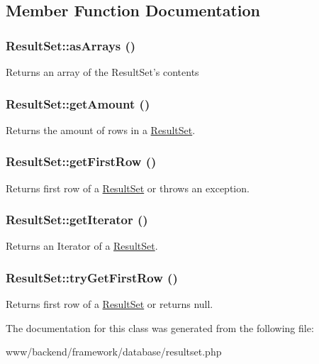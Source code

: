 \subsection{Member Function Documentation}
\hypertarget{classResultSet_aedc1f5a1d07f1a027eeceb1ff4c02225}{
\subsubsection[{asArrays}]{\setlength{\rightskip}{0pt plus 5cm}ResultSet::asArrays ()}}
\label{classResultSet_aedc1f5a1d07f1a027eeceb1ff4c02225}
Returns an array of the ResultSet's contents \hypertarget{classResultSet_a5f84a517e8af2bdd202b663f7e63a943}{
\subsubsection[{getAmount}]{\setlength{\rightskip}{0pt plus 5cm}ResultSet::getAmount ()}}
\label{classResultSet_a5f84a517e8af2bdd202b663f7e63a943}
Returns the amount of rows in a \hyperlink{classResultSet}{ResultSet}. \hypertarget{classResultSet_af7f034541c0d410bd2def9925074a993}{
\subsubsection[{getFirstRow}]{\setlength{\rightskip}{0pt plus 5cm}ResultSet::getFirstRow ()}}
\label{classResultSet_af7f034541c0d410bd2def9925074a993}
Returns first row of a \hyperlink{classResultSet}{ResultSet} or throws an exception. \hypertarget{classResultSet_a8eb3574cf0f0176005f873c4f85d18d1}{
\subsubsection[{getIterator}]{\setlength{\rightskip}{0pt plus 5cm}ResultSet::getIterator ()}}
\label{classResultSet_a8eb3574cf0f0176005f873c4f85d18d1}
Returns an Iterator of a \hyperlink{classResultSet}{ResultSet}. \hypertarget{classResultSet_ab677b0700c7706b6be5d01c9aa733140}{
\subsubsection[{tryGetFirstRow}]{\setlength{\rightskip}{0pt plus 5cm}ResultSet::tryGetFirstRow ()}}
\label{classResultSet_ab677b0700c7706b6be5d01c9aa733140}
Returns first row of a \hyperlink{classResultSet}{ResultSet} or returns null. 

The documentation for this class was generated from the following file:\begin{DoxyCompactItemize}
\item 
www/backend/framework/database/resultset.php\end{DoxyCompactItemize}
